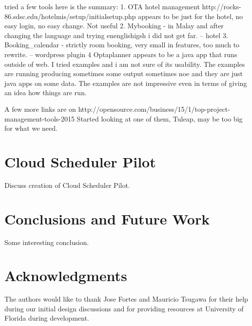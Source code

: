 \documentclass{acm_proc_article-sp}
\begin{document}
		
 tried a few tools  here is the summary:
1. OTA hotel management   http://rocks-86.sdsc.edu/hotelmis/setup/initialsetup.php
    appears to be just for the hotel, no easy login, no easy change. Not useful
2. Mybooking - in Malay and after changing the language and trying enenglishigsh i did not get far. -- hotel
3. Booking_calendar - strictly room booking, very small in features, too much to rewrite. -- wordpress plugin
4 Optaplanner appears to be a java app that runs outside of web. I tried examples and i am
   not sure of its usability. The examples are running producing sometimes some output sometimes noe
   and they are just java apps on some data. The examples  are not impressive even in terms of giving
   an idea how things are run. 

A few more links are on http://opensource.com/business/15/1/top-project-management-tools-2015
Started looking at  one of them, Tuleap, may be too big for what we need. 


\section{Cloud Scheduler Pilot}
\label{Sec:Pilot}

Discuss creation of Cloud Scheduler Pilot.

\section{Conclusions and Future Work}
\label{Sec:Conclusions}

Some interesting conclusion.

\section{Acknowledgments}

The authors would like to thank Jose Fortes and Mauricio Tsugawa for their help during our initial design discussions and for providing resources at University of Florida during development.


  
\end{document}
